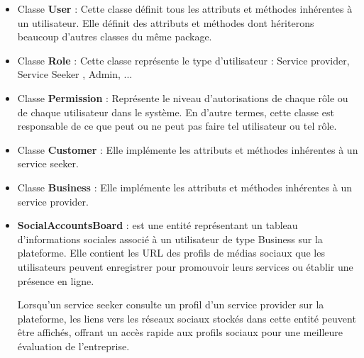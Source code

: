 \begin{itemize} 
    \item Classe \textbf{User} : Cette classe définit tous les attributs et méthodes inhérentes à un utilisateur. Elle  définit des attributs et méthodes dont hériterons beaucoup d'autres classes du même package.
    \item Classe \textbf{Role} : Cette classe représente le type d'utilisateur : Service provider, Service Seeker , Admin, ...
    \item Classe \textbf{Permission} : Représente le niveau d'autorisations de chaque rôle ou de chaque utilisateur dans le système. En d'autre termes, cette classe est responsable de ce que peut ou ne peut pas faire tel utilisateur ou tel rôle.
    \item Classe \textbf{Customer} : Elle implémente les attributs et méthodes inhérentes à un service seeker.
    \item Classe \textbf{Business} : Elle implémente les attributs et méthodes inhérentes à un service provider.

    \item \textbf{SocialAccountsBoard} : est une entité représentant un tableau d'informations sociales associé à un utilisateur de type Business sur la plateforme. Elle contient les URL des profils de médias sociaux que les utilisateurs peuvent enregistrer pour promouvoir leurs services ou établir une présence en ligne. 

    \vspace{0.35cm}

    Lorsqu'un service seeker consulte un profil d'un service provider sur la plateforme, les liens vers les réseaux sociaux stockés dans cette entité peuvent être affichés, offrant un accès rapide aux profils sociaux pour une meilleure évaluation de l'entreprise.
\end{itemize}

\vspace{0.35cm}

